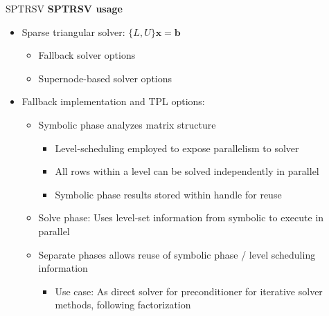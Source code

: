 \begin{frame}[fragile]{SPTRSV}
\textbf{SPTRSV usage}

  \begin{itemize}
    \item Sparse triangular solver: $\{L,U\}\mathbf{x} = \mathbf{b}$
    \begin{itemize}
      \item Fallback solver options
      \item Supernode-based solver options
    \end{itemize}
    \item Fallback implementation and TPL options:
    \begin{itemize}
      \item Symbolic phase analyzes matrix structure
      \begin{itemize}
        \item Level-scheduling employed to expose parallelism to solver
        \item All rows within a level can be solved independently in parallel
        \item Symbolic phase results stored within handle for reuse
      \end{itemize}
      \item Solve phase: Uses level-set information from symbolic to execute in parallel
      \item Separate phases allows reuse of symbolic phase / level scheduling information
      \begin{itemize}
        \item Use case: As direct solver for preconditioner for iterative solver methods, following factorization
      \end{itemize}
    \end{itemize}
  \end{itemize}

\end{frame}


